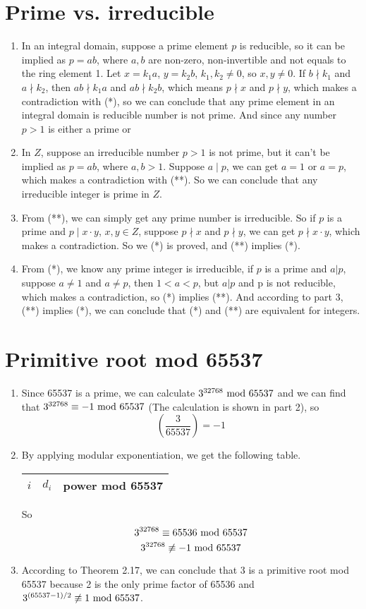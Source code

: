 \documentclass{article}
\renewcommand{\mod}{{\rm\ mod\ }}
\begin{document}
\section{Prime vs. irreducible}
\begin{enumerate}
\item
In an integral domain, suppose a prime element $p$ is reducible, so it can be implied as $p=ab$, where $a,b$ are non-zero, non-invertible and not equals to the ring element 1. Let $x=k_1a$, $y=k_2b$, $k_1,k_2\neq 0$, so $x,y\neq 0$. If $b\nmid k_1$ and $a\nmid k_2$, then $ab\nmid k_1a$ and $ab\nmid k_2b$, which means $p\nmid x$ and $p\nmid y$, which makes a contradiction with (*), so we can conclude that any prime element in an integral domain is reducible number is not prime. And since any number $p>1$ is either a prime or
\item
In $Z$, suppose an irreducible number $p>1$ is not prime, but it can't be implied as $p=ab$, where $a,b>1$. Suppose $a\mid p$, we can get $a=1$ or $a=p$, which makes a contradiction with (**). So we can conclude that any irreducible integer is prime in $Z$.
\item
From (**), we can simply get any prime number is irreducible. So if $p$ is a prime and $p\mid x\cdot y$, $x,y\in Z$, suppose $p\nmid x$ and $p\nmid y$, we can get $p\nmid x\cdot y$, which makes a contradiction. So we (*) is proved, and (**) implies (*).
\item
From (*), we know any prime integer is irreducible, if $p$ is a prime and $a|p$, suppose $a\neq1$ and $a\neq p$, then $1<a<p$, but $a|p$ and p is not reducible, which makes a contradiction, so (*) implies (**). And according to part 3, (**) implies (*), we can conclude that (*) and (**) are equivalent for integers.
\end{enumerate}


\section{Primitive root mod 65537}
\begin{enumerate}
\item
Since 65537 is a prime, we can calculate $3^{32768}\mod65537$ and we can find that $3^{32768}\equiv-1\mod65537$ (The calculation is shown in part 2), so $$\left(\frac{3}{65537}\right)=-1$$
\item
By applying modular exponentiation, we get the following table.
\begin{center}
\begin{tabular}{ccc}
$i$ & $d_i$ & power mod 65537 \\\hline

\end{tabular}
\end{center}

So $$3^{32768}\equiv65536\mod65537$$
$$3^{32768}\not\equiv-1\mod65537$$

\item
According to Theorem 2.17, we can conclude that 3 is a primitive root mod 65537 because 2 is the only prime factor of 65536 and $3^{(65537-1)/2}\not\equiv1\mod65537$.
\end{enumerate}
\end{document}
